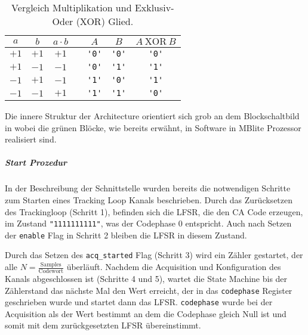 \begin{table}[htbp]
    \ttabbox
    {
        \caption[Exklusiv-Oder Glied]{Vergleich Multiplikation und Exklusiv-Oder (XOR) Glied.}
        \label{TabXOR}
    }
    {
    \begin{tabular}{c c c c c c c}
        \toprule
        $a$ 	& $b$ 	& $a\cdot b$ 	& & $A$	& $B$		& $A~ \textrm{XOR} ~B$ \\
        \midrule
        $+1$	& $+1$ 	& $+1$ 		& & \lstinline$'0'$	& \lstinline$'0'$ & \lstinline$'0'$\\
        $+1$	& $-1$ 	& $-1$ 		& & \lstinline$'0'$	& \lstinline$'1'$ & \lstinline$'1'$\\
        $-1$	& $+1$ 	& $-1$ 		& & \lstinline$'1'$	& \lstinline$'0'$ & \lstinline$'1'$\\
        $-1$	& $-1$ 	& $+1$ 		& & \lstinline$'1'$	& \lstinline$'1'$ & \lstinline$'0'$\\
        \bottomrule
    \end{tabular}
}
\end{table}

Die innere Struktur der Architecture orientiert sich grob an dem Blockschaltbild in  wobei die grünen Blöcke, wie bereits erwähnt, in Software in MBlite Prozessor realisiert sind.

\subparagraph{Start Prozedur} In der Beschreibung der Schnittstelle wurden bereits die notwendigen Schritte zum Starten eines Tracking Loop Kanals beschrieben. Durch das Zurücksetzen des Trackingloop (Schritt 1), befinden sich die LFSR, die den \gls{CA} Code erzeugen, im Zustand \lstinline$"1111111111"$, was der Codephase $0$ entspricht. Auch nach Setzen der \lstinline$enable$ Flag in Schritt 2 bleiben die LFSR in diesem Zustand. 

Durch das Setzen des \lstinline$acq_started$ Flag (Schritt 3) wird ein Zähler gestartet, der alle $N=\frac{\textrm{Samples}}{\textrm{Codewort}}$ überläuft. Nachdem die Acquisition und Konfiguration des Kanals abgeschlossen ist (Schritte 4 und 5), wartet die State Machine bis der Zählerstand das nächste Mal den Wert erreicht, der in das \lstinline$codephase$ Register geschrieben wurde und startet dann das LFSR. \lstinline$codephase$ wurde bei der Acquisition als der Wert bestimmt an dem die Codephase gleich Null ist und somit mit dem zurückgesetzten LFSR übereinstimmt. 